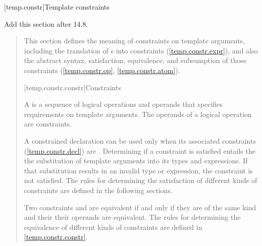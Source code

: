 
[temp.constr]{Template constraints}

Add this section after 14.8.

\begin{quote}

\pnum
\enternote
This section defines the meaning of constraints on template arguments, including
the translation of s
into constraints (\ref{temp.constr.expr}),
and also the abstract syntax, satisfaction, equivalence, and 
subsumption of those constraints (\ref{temp.constr.op}, \ref{temp.constr.atom}).
\exitnote


[temp.constr.constr]{Constraints}

\pnum
A  is a sequence of logical operations and 
operands that specifies requirements on template arguments.
\enternote The operands of a logical operation are constraints. \exitnote






\pnum
A constrained declaration can be used only when its associated
constraints (\ref{temp.constr.decl}) are . 
% 
Determining if a constraint is satisfied entails the the substitution 
of template arguments into its types and expressions. If that substitution
results in an invalid type or expression, the constraint is not satisfied.
% 
The rules for determining the satisfaction of different kinds of 
constraints are defined in the following sections.


\pnum Two constraints  and  are equivalent if and
only if they are of the same kind and their their operands are equivalent. 
The rules for determining the equivalence of different kinds of constraints
are defined in \ref{temp.constr.constr}.


\end{quote}
